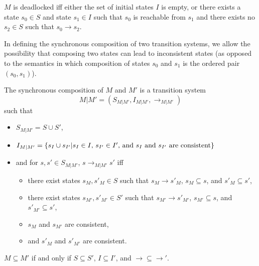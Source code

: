 \documentclass{llncs/llncs}
\begin{document}
\begin{definition}[Deadlock]
$M$ is deadlocked iff either the set of initial states $I$ is empty, or there exists a state $s_0 \in S$ and state $s_1 \in I$ such that $s_0$ is reachable from $s_1$ and there exists no $s_2 \in S$ such that $s_0 \rightarrow s_2$.
\end{definition}


In defining the synchronous composition of two transition systems, we allow the possibility that composing two states can lead to inconsistent states (as opposed to the semantics in which composition of states $s_0$ and $s_1$ is the ordered pair $(s_0, s_1)$).

\begin{definition}
The synchronous composition of $M$ and $M'$ is a transition system
$$M | M' = (S_{M | M'}, I_{M | M'}, \rightarrow_{M | M'})$$
\noindent
such that
\begin{itemize}
\item $S_{M | M'} = S \cup S'$,
\item $I_{M | M'} = \{ s_I \cup s_{I'} | s_I \in I\textnormal{, }s_{I'} \in I'\textnormal{, and } s_I \textnormal{ and } s_{I'}\textnormal{ are consistent}\}$
\item and for $s, s' \in S_{M | M'}$, $s \rightarrow_{M | M'} s'$ iff
  \begin{itemize}
  \item there exist states $s_M, s'_M \in S$ such that $s_M \rightarrow s'_M$, $s_M \subseteq s$, and $s'_M \subseteq s'$,
  \item there exist states $s_{M'}, s'_{M'} \in S'$ such that $s_{M'} \rightarrow s'_{M'}$, $s_{M'} \subseteq s$, and $s'_{M'} \subseteq s'$,
  \item $s_M$ and $s_{M'}$ are consistent,
  \item and $s'_M$ and $s'_{M'}$ are consistent.
  \end{itemize}
\end{itemize}
\end{definition}

\begin{definition}
$M \subseteq M'$ if and only if $S \subseteq S'$, $I \subseteq I'$, and $\rightarrow \subseteq \rightarrow'$.
\end{definition}
\end{document}
